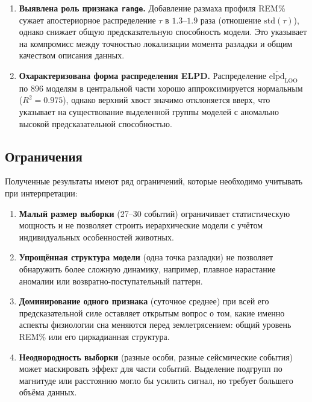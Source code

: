 \documentclass[14pt]{mmcs_article}
\begin{document}
\begin{enumerate}
	\item \textbf{Выявлена роль признака \texttt{range}.}
	Добавление размаха профиля REM\% сужает
	апостериорное распределение $\tau$ в $1.3$--$1.9$
	раза (отношение $\mathrm{std}(\tau)$), однако
	снижает общую предсказательную способность
	модели. Это указывает на компромисс между
	точностью локализации момента разладки и общим
	качеством описания данных.
	
	
	\item \textbf{Охарактеризована форма распределения
		ELPD.} Распределение
	$\overline{\mathrm{elpd}}_{\mathrm{LOO}}$ по 896
	моделям в центральной части хорошо
	аппроксимируется нормальным ($R^2 = 0.975$),
	однако верхний хвост значимо отклоняется вверх,
	что указывает на существование выделенной группы
	моделей с аномально высокой предсказательной
	способностью.
\end{enumerate}

\subsection*{Ограничения}

Полученные результаты имеют ряд ограничений, которые
необходимо учитывать при интерпретации:

\begin{enumerate}
	\item \textbf{Малый размер выборки} (27--30 событий)
	ограничивает статистическую мощность и не
	позволяет строить иерархические модели с учётом
	индивидуальных особенностей животных.
	
	
	\item \textbf{Упрощённая структура модели} (одна точка
	разладки) не позволяет обнаружить более сложную
	динамику, например, плавное нарастание аномалии
	или возвратно-поступательный паттерн.
	
	\item \textbf{Доминирование одного признака}
	(суточное среднее) при всей его
	предсказательной силе оставляет открытым вопрос
	о том, какие именно аспекты физиологии сна
	меняются перед землетрясением: общий уровень
	REM\% или его циркадианная структура.
	
	\item \textbf{Неоднородность выборки} (разные особи,
	разные сейсмические события) может маскировать
	эффект для части событий. Выделение подгрупп по
	магнитуде или расстоянию могло бы усилить
	сигнал, но требует большего объёма данных.
\end{enumerate}
\end{document}
